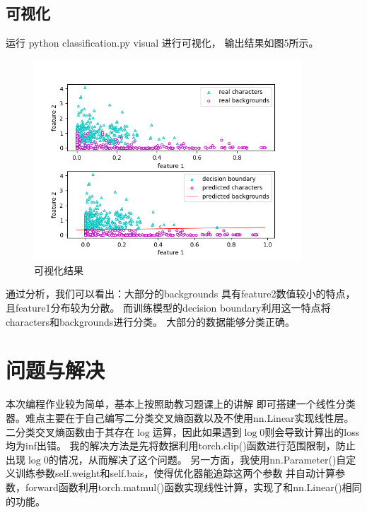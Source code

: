 \documentclass[a4paper]{article}
\begin{document}
\subsection{可视化}
运行 python classification.py visual 进行可视化，
输出结果如图5所示。\par
\begin{figure}[hp]
    \centering
    \includegraphics[width=10cm]{image/visual_figure.png}
    \caption{可视化结果}
\end{figure}
通过分析，我们可以看出：大部分的backgrounds
具有feature2数值较小的特点，且feature1分布较为分散。
而训练模型的decision boundary利用这一特点将characters和backgrounds进行分类。
大部分的数据能够分类正确。
\section{问题与解决}
本次编程作业较为简单，基本上按照助教习题课上的讲解
即可搭建一个线性分类器。难点主要在于自己编写二分类交叉熵函数以及不使用nn.Linear实现线性层。
二分类交叉熵函数由于其存在$\log$运算，因此如果遇到$\log 0 $则会导致计算出的loss均为inf出错。
我的解决方法是先将数据利用torch.clip()函数进行范围限制，防止出现$\log 0 $的情况，从而解决了这个问题。
另一方面，我使用nn.Parameter()自定义训练参数self.weight和self.bais，使得优化器能追踪这两个参数
并自动计算参数，forward函数利用torch.matmul()函数实现线性计算，实现了和nn.Linear()相同的功能。
\end{document}
